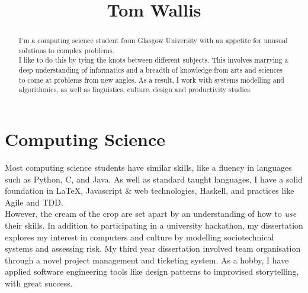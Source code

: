 \documentclass{tufte-handout}
\title{Tom Wallis}
\date{}
\begin{document}
\maketitle

\begin{abstract}
I'm a computing science student from Glasgow University with an appetite for unusual solutions to complex problems.\\
I like to do this by tying the knots between different subjects. This involves marrying a deep understanding of informatics and a breadth of knowledge from arts and sciences to come at problems from new angles. As a result, I work with systems modelling and algorithmics, as well as linguistics, culture, design and productivity studies.
\end{abstract}

\section{Computing Science}
Most computing science students have similar skills, like a fluency in languages such as Python, C, and Java. As well as standard taught languages, I have a solid foundation in \LaTeX, Javascript {\&} web technologies, Haskell, and practices like Agile and TDD.\\
However, the cream of the crop are set apart by an understanding of how to \emph{use} their skills. In addition to participating in a university hackathon, my dissertation explores my interest in computers and culture by modelling sociotechnical systems and assessing risk. My third year dissertation involved team organisation through a novel project management and ticketing system. As a hobby, I have applied software engineering tools like design patterns to improvised storytelling, with great success. 
\end{document}
